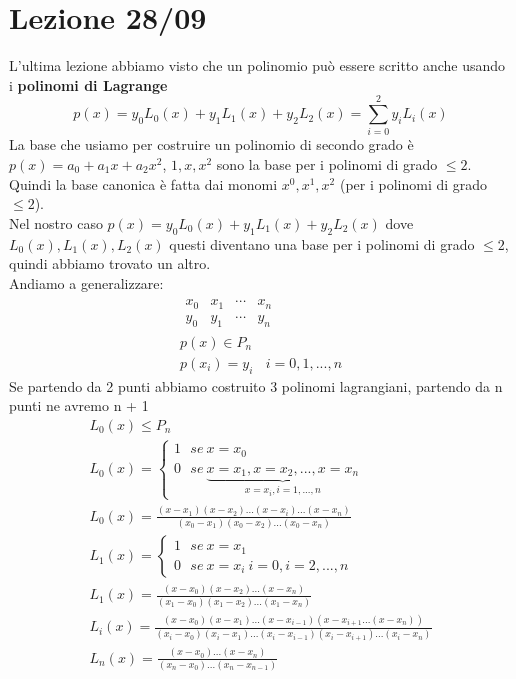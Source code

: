 \documentclass[a4paper, portrait]{book}
\numberwithin{equation}{chapter} %
\begin{document}
\chapter{Lezione 28/09}
L'ultima lezione abbiamo visto che un polinomio può essere scritto anche usando i \textbf{polinomi di Lagrange}
\begin{equation}
    p(x) = y_0 L_0(x) + y_1 L_1(x) + y_2 L_2(x) = \sum_{i = 0}^2 y_i L_i(x)
\end{equation}
La base che usiamo per costruire un polinomio di secondo grado è $p(x) = a_0 + a_1 x + a_2 x^2$, $1,x,x^2$ sono la base per i polinomi di grado $\leq 2$. Quindi la base canonica è fatta dai monomi $x^0, x^1, x^2$ (per i polinomi di grado $\leq 2$).\\
Nel nostro caso $p(x) = y_0 L_0(x) + y_1 L_1(x) + y_2 L_2(x)$ dove $L_0(x), L_1(x), L_2(x)$ questi diventano una base per i polinomi di grado $\leq 2$, quindi abbiamo trovato un altro.\\
Andiamo a generalizzare:
\begin{gather}
    \begin{matrix}
        x_0&x_1&\cdots&x_n\\
        y_0&y_1&\cdots&y_n
    \end{matrix}\\
    p(x) \in P_n\\
    p(x_i) = y_i \ \ \ \ i = 0,1,...,n
\end{gather}
Se partendo da 2 punti abbiamo costruito 3 polinomi lagrangiani, partendo da n punti ne avremo n + 1
\begin{gather}
    L_0(x) \leq P_n\\
    L_0(x) = \begin{cases}
        1 \ \ \ se \ x = x_0\\
        0 \ \ \ se \ \underbrace{x = x_1,x=x_2,...,x = x_n}_{x=x_i, i = 1,...,n}
    \end{cases}\\
    L_0(x) = \frac{(x-x_1)(x-x_2)...(x-x_i)...(x-x_n)}{(x_0-x_1)(x_0 - x_2)...(x_0 - x_n)}\\
    L_1(x) = \begin{cases}
        1 \ \ \ se \ x = x_1\\
        0 \ \ \ se \ x=x_i \ i = 0, i = 2,...,n
    \end{cases}\\
    L_1(x) = \frac{(x-x_0)(x-x_2)...(x-x_n)}{(x_1 - x_0)(x_1-x_2)...(x_1- x_n)}\\
    L_i(x) = \frac{(x-x_0)(x-x_1)...(x-x_{i-1})(x-x_{i+1}...(x-x_n))}{(x_i-x_0)(x_i-x_1)...(x_i -x_{i-1})(x_i - x_{i+1})...(x_i-x_n)}\\
    L_n(x) = \frac{(x-x_0)...(x-x_n)}{(x_n-x_0)...(x_n-x_{n-1})}
\end{gather}
\end{document}

